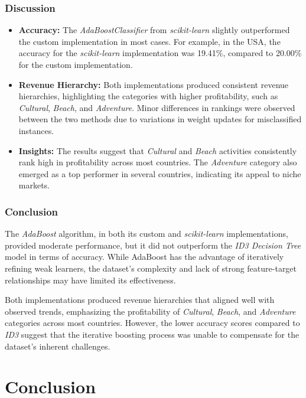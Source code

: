 \documentclass{article}
\begin{document}
\subsubsection{Discussion}

\begin{itemize}
    \item \textbf{Accuracy:} The \textit{AdaBoostClassifier} from \textit{scikit-learn} slightly outperformed the custom implementation in most cases. For example, in the USA, the accuracy for the \textit{scikit-learn} implementation was 19.41\%, compared to 20.00\% for the custom implementation.
    \item \textbf{Revenue Hierarchy:} Both implementations produced consistent revenue hierarchies, highlighting the categories with higher profitability, such as \textit{Cultural}, \textit{Beach}, and \textit{Adventure}. Minor differences in rankings were observed between the two methods due to variations in weight updates for misclassified instances.
    \item \textbf{Insights:} The results suggest that \textit{Cultural} and \textit{Beach} activities consistently rank high in profitability across most countries. The \textit{Adventure} category also emerged as a top performer in several countries, indicating its appeal to niche markets.
\end{itemize}

\subsubsection{Conclusion}

The \textit{AdaBoost} algorithm, in both its custom and \textit{scikit-learn} implementations, provided moderate performance, but it did not outperform the \textit{ID3 Decision Tree} model in terms of accuracy. While AdaBoost has the advantage of iteratively refining weak learners, the dataset's complexity and lack of strong feature-target relationships may have limited its effectiveness.

Both implementations produced revenue hierarchies that aligned well with observed trends, emphasizing the profitability of \textit{Cultural}, \textit{Beach}, and \textit{Adventure} categories across most countries. However, the lower accuracy scores compared to \textit{ID3} suggest that the iterative boosting process was unable to compensate for the dataset's inherent challenges.


\section{Conclusion}
\end{document}
